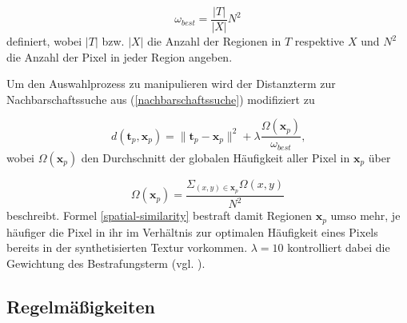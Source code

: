 \begin{equation*}
	\omega_{\textit{best}} = \frac{|T|}{|X|}N^2
\end{equation*}
definiert, wobei $|T|$ bzw. $|X|$ die Anzahl der Regionen in $T$ respektive $X$ und $N^2$ die Anzahl der Pixel in jeder Region angeben.

Um den Auswahlprozess zu manipulieren wird der Distanzterm zur Nachbarschaftssuche aus (\ref{nachbarschaftssuche}) modifiziert zu

\begin{equation}
	d(\textbf{t}_p, \textbf{x}_p) = \lVert \textbf{t}_p - \textbf{x}_p \rVert^2 + \lambda \frac{\Omega(\textbf{x}_p)}{\omega_{\textit{best}}}\text{,}
	\label{spatial-similarity}
\end{equation}
wobei $\Omega(\textbf{x}_p)$ den Durchschnitt der globalen Häufigkeit aller Pixel in $\textbf{x}_p$ über

\begin{equation*}
	\Omega(\textbf{x}_p) = \frac{\Sigma_{(x,y) \in \textbf{x}_p}\Omega(x,y)}{N^2}
\end{equation*}
beschreibt.
Formel \ref{spatial-similarity} bestraft damit Regionen $\textbf{x}_p$ umso mehr, je häufiger die Pixel in ihr im Verhältnis zur optimalen Häufigkeit eines Pixels bereits in der synthetisierten Textur vorkommen.
$\lambda = 10$ kontrolliert dabei die Gewichtung des Bestrafungsterm (vgl. \cite{SelfTuning}).

\subsection{Regelmäßigkeiten}